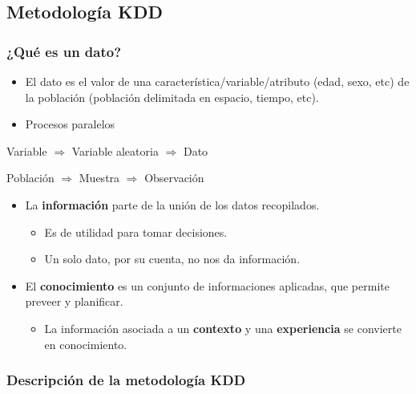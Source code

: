 \documentclass[
]{book}
\providecommand{\tightlist}{%
  \setlength{\itemsep}{0pt}\setlength{\parskip}{0pt}}
\begin{document}
\hypertarget{metodologuxeda-kdd}{%
\subsection{Metodología KDD}\label{metodologuxeda-kdd}}

\hypertarget{quuxe9-es-un-dato}{%
\subsubsection{¿Qué es un dato?}\label{quuxe9-es-un-dato}}

\begin{itemize}
\item
  El dato es el valor de una
  característica/variable/atributo
  (edad, sexo, etc) de la población
  (población delimitada en espacio, tiempo, etc).
\item
  Procesos paralelos
\end{itemize}

Variable
\(\Rightarrow\)
Variable aleatoria
\(\Rightarrow\)
Dato

Población
\(\Rightarrow\)
Muestra
\(\Rightarrow\)
Observación

\begin{itemize}
\tightlist
\item
  La \textbf{información} parte de la unión
  de los datos recopilados.

  \begin{itemize}
  \tightlist
  \item
    Es de utilidad para tomar decisiones.
  \item
    Un solo dato, por su cuenta,
    no nos da información.
  \end{itemize}
\item
  El \textbf{conocimiento} es un conjunto de informaciones
  aplicadas, que permite preveer y planificar.

  \begin{itemize}
  \tightlist
  \item
    La información asociada a un \textbf{contexto} y una
    \textbf{experiencia} se convierte en conocimiento.
  \end{itemize}
\end{itemize}

\hypertarget{descripciuxf3n-de-la-metodologuxeda-kdd}{%
\subsubsection{Descripción de la metodología KDD}\label{descripciuxf3n-de-la-metodologuxeda-kdd}}
\end{document}
